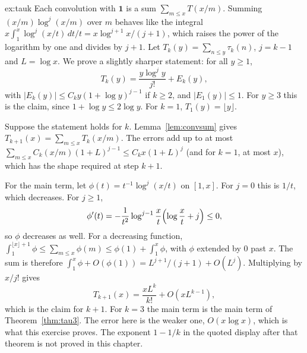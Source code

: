 \begin{solution}{ex:tauk}
\idea Each convolution with $\mathbf1$ is a sum $\sum_{m\le x}T(x/m)$. Summing $(x/m)\log^j(x/m)$ over $m$ behaves like the integral $x\int_1^x\log^j(x/t)\,dt/t=x\log^{j+1}x/(j+1)$, which raises the power of the logarithm by one and divides by $j+1$.
\writeup Let $T_k(y)=\sum_{n\le y}\tau_k(n)$, $j=k-1$ and $L=\log x$. We prove a slightly sharper statement: for all $y\ge1$,
\[
T_k(y)=\frac{y\log^j y}{j!}+E_k(y),
\]
with $|E_k(y)|\le C_k y(1+\log y)^{j-1}$ if $k\ge2$, and $|E_1(y)|\le1$. For $y\ge3$ this is the claim, since $1+\log y\le2\log y$. For $k=1$, $T_1(y)=\lfloor y\rfloor$.

Suppose the statement holds for $k$. Lemma~\ref{lem:convsum} gives $T_{k+1}(x)=\sum_{m\le x}T_k(x/m)$. The errors add up to at most $\sum_{m\le x}C_k(x/m)(1+L)^{j-1}\le C_k x(1+L)^j$ (and for $k=1$, at most $x$), which has the shape required at step $k+1$.

For the main term, let $\phi(t)=t^{-1}\log^j(x/t)$ on $[1,x]$. For $j=0$ this is $1/t$, which decreases. For $j\ge1$,
\[
\phi'(t)=-\frac1{t^2}\log^{j-1}\frac xt\Bigl(\log\frac xt+j\Bigr)\le0,
\]
so $\phi$ decreases as well. For a decreasing function, $\int_1^{\lfloor x\rfloor+1}\phi\le\sum_{m\le x}\phi(m)\le\phi(1)+\int_1^x\phi$, with $\phi$ extended by $0$ past $x$. The sum is therefore $\int_1^x\phi+O(\phi(1))=L^{j+1}/(j+1)+O(L^j)$. Multiplying by $x/j!$ gives
\[
T_{k+1}(x)=\frac{x L^k}{k!}+O(x L^{k-1}),
\]
which is the claim for $k+1$. For $k=3$ the main term is the main term of Theorem~\ref{thm:tau3}. The error here is the weaker one, $O(x\log x)$, which is what this exercise proves. The exponent $1-1/k$ in the quoted display after that theorem is not proved in this chapter.
\end{solution}

